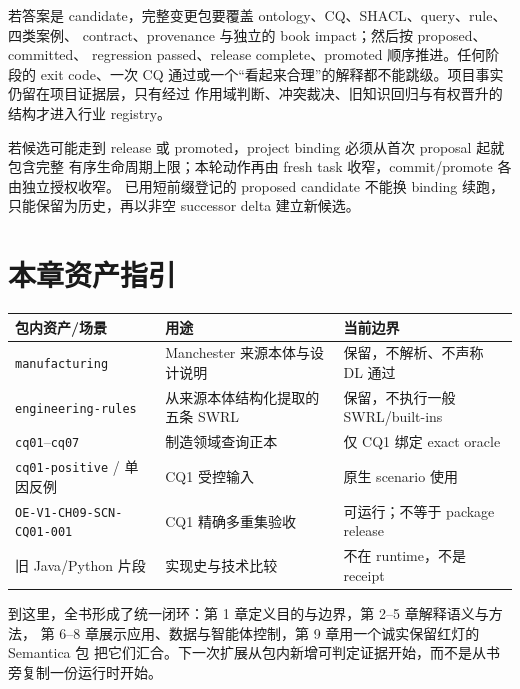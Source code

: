 若答案是 candidate，完整变更包要覆盖 ontology、CQ、SHACL、query、rule、四类案例、
contract、provenance 与独立的 book impact；然后按 proposed、committed、
regression passed、release complete、promoted 顺序推进。任何阶段的 exit code、一次
CQ 通过或一个“看起来合理”的解释都不能跳级。项目事实仍留在项目证据层，只有经过
作用域判断、冲突裁决、旧知识回归与有权晋升的结构才进入行业 registry。

若候选可能走到 release 或 promoted，project binding 必须从首次 proposal 起就包含完整
有序生命周期上限；本轮动作再由 fresh task 收窄，commit/promote 各由独立授权收窄。
已用短前缀登记的 proposed candidate 不能换 binding 续跑，只能保留为历史，再以非空
successor delta 建立新候选。

\section{本章资产指引}

\begin{center}
\begin{tabularx}{\linewidth}{@{}lXX@{}}
\toprule
\textbf{包内资产/场景} & \textbf{用途} & \textbf{当前边界} \\
\midrule
\texttt{manufacturing} & Manchester 来源本体与设计说明 & 保留，不解析、不声称 DL 通过 \\
\texttt{engineering-rules} & 从来源本体结构化提取的五条 SWRL & 保留，不执行一般 SWRL/built-ins \\
\texttt{cq01}--\texttt{cq07} & 制造领域查询正本 & 仅 CQ1 绑定 exact oracle \\
\texttt{cq01-positive} / 单因反例 & CQ1 受控输入 & 原生 scenario 使用 \\
\texttt{OE-V1-CH09-SCN-CQ01-001} & CQ1 精确多重集验收 & 可运行；不等于 package release \\
旧 Java/Python 片段 & 实现史与技术比较 & 不在 runtime，不是 receipt \\
\bottomrule
\end{tabularx}
\end{center}

到这里，全书形成了统一闭环：第 1 章定义目的与边界，第 2--5 章解释语义与方法，
第 6--8 章展示应用、数据与智能体控制，第 9 章用一个诚实保留红灯的 Semantica 包
把它们汇合。下一次扩展从包内新增可判定证据开始，而不是从书旁复制一份运行时开始。
